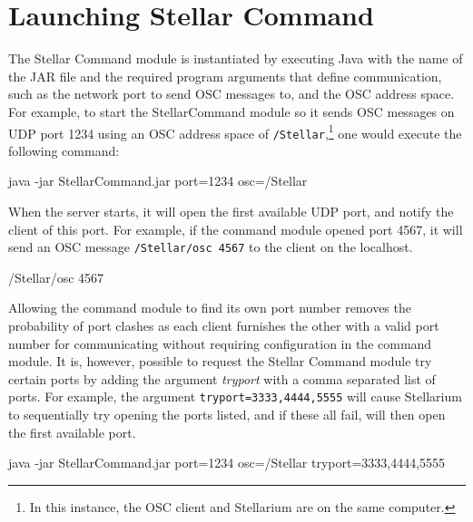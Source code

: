 \documentclass[10pt,a4paper,extrafontsizes]{memoir}
\begin{document}
\section{Launching Stellar Command}
The Stellar Command module is instantiated by executing Java  with the name of the JAR file and the required program arguments that define communication, such as the network port to send OSC messages to, and the OSC address space.  For example, to start the StellarCommand module so it sends OSC messages on UDP port 1234  using an OSC address space of \texttt{/Stellar},\footnote{In this instance, the OSC client and Stellarium are on the same computer.} one would execute the following command:\\

\begin{syntax}

	java -jar StellarCommand.jar port=1234 osc=/Stellar  \\

\end{syntax}
\bigskip
   When the server starts, it will open the first available UDP port, and notify the client of this port. For example, if the command module opened port 4567, it will send an OSC message \texttt{/Stellar/osc 4567} to the client on the localhost. 
   
\begin{syntax}

	/Stellar/osc 4567  \\

\end{syntax}
\bigskip

Allowing the command module to find its own port number removes the probability of port clashes as each client furnishes the other with a valid port number for communicating without requiring configuration in the command module. It is, however, possible to request the Stellar Command module try certain ports by adding the argument \textit{tryport}  with a comma separated list of ports. For example, the argument \texttt{tryport=3333,4444,5555} will cause Stellarium to sequentially try opening the ports listed, and if these all fail, will then open the first available port.\\
   
   \begin{syntax}

   	java -jar StellarCommand.jar port=1234 osc=/Stellar  tryport=3333,4444,5555\\

   \end{syntax}
   \bigskip
   
\end{document}
